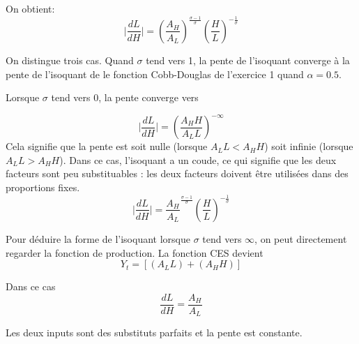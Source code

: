 \documentclass[11pt,a4paper]{article}
\begin{document}
On obtient: 
\begin{equation}
    \mid \frac{dL}{dH} \mid =(\frac{A_H}{A_L})^{\frac{\sigma -1}{\sigma}} (\frac{H}{L})^{-\frac{1} {\sigma}}
\end{equation}

On distingue trois cas.  Quand $\sigma$ tend vers 1, la pente de l'isoquant converge à la pente   de l'isoquant de le fonction Cobb-Douglas de l'exercice 1 quand $\alpha=0.5$.

Lorsque $\sigma$ tend vers 0,  la pente converge vers

\begin{equation}
   \mid \frac{dL}{dH} \mid=\left(\frac{A_H H}{A_L L}\right)^{-\infty} 
\end{equation}
Cela signifie que la pente est soit nulle (lorsque $A_L L<A_HH$) soit infinie (lorsque $A_L L>A_HH$). Dans ce cas, l'isoquant a un coude, ce qui signifie que les deux facteurs sont peu substituables : les deux facteurs doivent être utilisées dans des proportions fixes.
\begin{equation}
   \lvert \frac{dL}{dH} \mid =\frac{A_H}{A_L}^{\frac{\sigma -1}{\sigma}} (\frac{H}{L})^{-\frac{1} {\sigma}}
\end{equation}

Pour déduire la forme de l'isoquant lorsque $\sigma$ tend vers $\infty$, on peut directement regarder la fonction de production. La fonction CES devient
\begin{equation}\label{ces2}
Y_t=\left[  (A_L L)+  (A_HH)\right] 
\end{equation}

Dans ce cas  \begin{equation}
    \frac{dL}{dH}=\frac{A_H }{A_L}
\end{equation}


Les deux inputs sont des substituts parfaits et la pente est constante.  \bigskip



\end{document}
